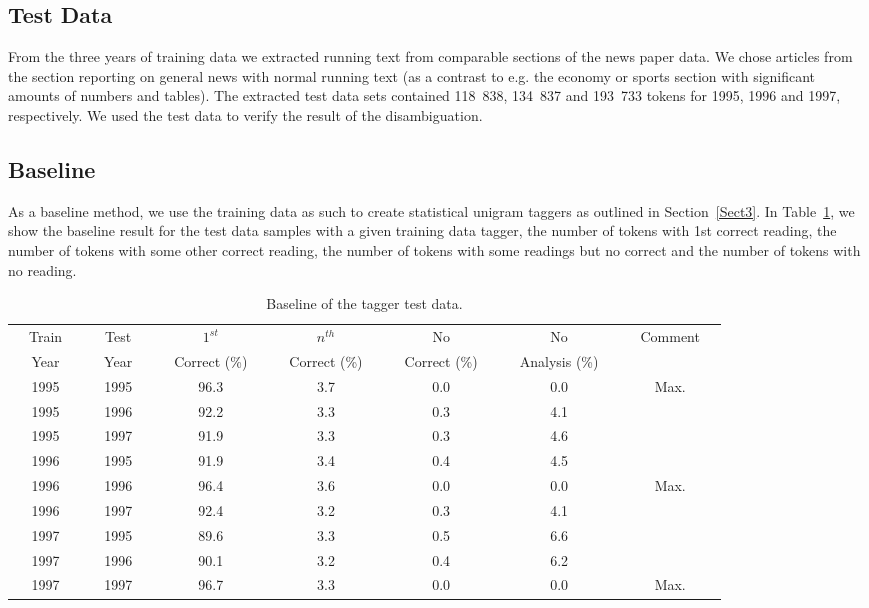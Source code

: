 \documentclass[postprint]{flammie}
\begin{document}
\subsection{Test Data}

From the three years of training data we extracted running text from
comparable sections of the news paper data. We chose articles from the
section reporting on general news with normal running text (as a
contrast to e.g. the economy or sports section with significant
amounts of numbers and tables). The extracted test data sets contained
118~838, 134~837 and 193~733 tokens for 1995, 1996 and 1997,
respectively. We used the test data to verify the result of the
disambiguation.

\subsection{Baseline}

As a baseline method, we use the training data as such to create
statistical unigram taggers as outlined in Section~\ref{Sect3}. In
Table~\ref{tab:taggerdata}, we show the baseline result for the test
data samples with a given training data tagger, the number of tokens
with 1st correct reading, the number of tokens with some other correct
reading, the number of tokens with some readings but no correct and
the number of tokens with no reading.

\begin{table}[htb!]
  \centering
  \caption{Baseline of the tagger test data.
  }\label{tab:taggerdata}
  \begin{scriptsize}
    \begin{tabular}{c|c|c|c|c|c|c}
      \hline
      ~~Train~~ & ~~Test~~ & ~~$1^{st}$~~& ~~$n^{th}$~~ & ~~No~~ & ~~No~~ & ~~Comment~~\\
      ~~Year~~ & ~~Year~~ & ~~Correct (\%)~~ & ~~Correct (\%)~~ & ~~Correct (\%)~~ & ~~Analysis (\%)~~ \\
      \hline 
      1995 & 1995 & 96.3 & 3.7 & 0.0 & 0.0 &~~Max.~~\\
      1995 & 1996 & 92.2 & 3.3 & 0.3 & 4.1 & \\
      1995 & 1997 & 91.9 & 3.3 & 0.3 & 4.6 & \\
      \hline 
      1996 & 1995 & 91.9 & 3.4 & 0.4 & 4.5 & \\
      1996 & 1996 & 96.4 & 3.6 & 0.0 & 0.0 & ~~Max.~~\\
      1996 & 1997 & 92.4 & 3.2 & 0.3 & 4.1 & \\
      \hline 
      1997 & 1995 & 89.6 & 3.3 & 0.5 & 6.6 & \\
      1997 & 1996 & 90.1 & 3.2 & 0.4 & 6.2 & \\
      1997 & 1997 & 96.7 & 3.3 & 0.0 & 0.0 & ~~Max.~~\\
      \hline 
    \end{tabular}
  \end{scriptsize}
\end{table}
\end{document}
